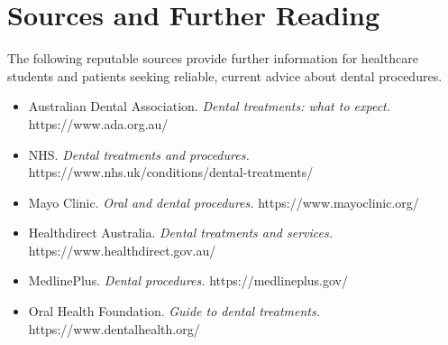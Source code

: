\section*{Sources and Further Reading}
The following reputable sources provide further information for healthcare students and patients seeking reliable, current advice about dental procedures.

\begin{itemize}
    \item Australian Dental Association. \textit{Dental treatments: what to expect.} https://www.ada.org.au/
    \item NHS. \textit{Dental treatments and procedures.} https://www.nhs.uk/conditions/dental-treatments/
    \item Mayo Clinic. \textit{Oral and dental procedures.} https://www.mayoclinic.org/
    \item Healthdirect Australia. \textit{Dental treatments and services.} https://www.healthdirect.gov.au/
    \item MedlinePlus. \textit{Dental procedures.} https://medlineplus.gov/
    \item Oral Health Foundation. \textit{Guide to dental treatments.} https://www.dentalhealth.org/
\end{itemize}
